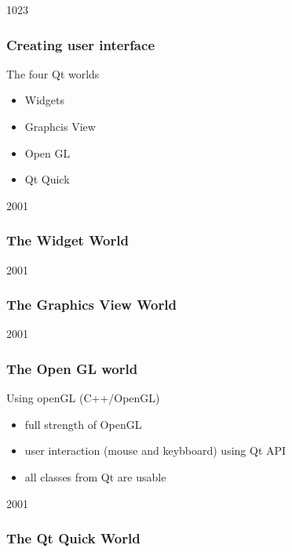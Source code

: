 
\begin{slide}{1023}\frametitle{Creating user interface}
\vspace*{1.5em}
The four Qt worlds
\begin{itemize}
\item Widgets
\item Graphcis View
\item Open GL
\item Qt Quick
\end{itemize}

\end{slide}


\begin{slide}{2001}\frametitle{The Widget World}

\end{slide}


\begin{slide}{2001}\frametitle{The Graphics View World}

\end{slide}


\begin{slide}{2001}\frametitle{The Open GL world}
\vspace*{1.5em}
Using openGL (C++/OpenGL)
\begin{itemize}
\item full strength of OpenGL
\item user interaction (mouse and keybboard) using Qt API
\item all classes from Qt are usable
\end{itemize}

\end{slide}


\begin{slide}{2001}\frametitle{The Qt Quick World}
\vspace*{15mm}

\end{slide}

